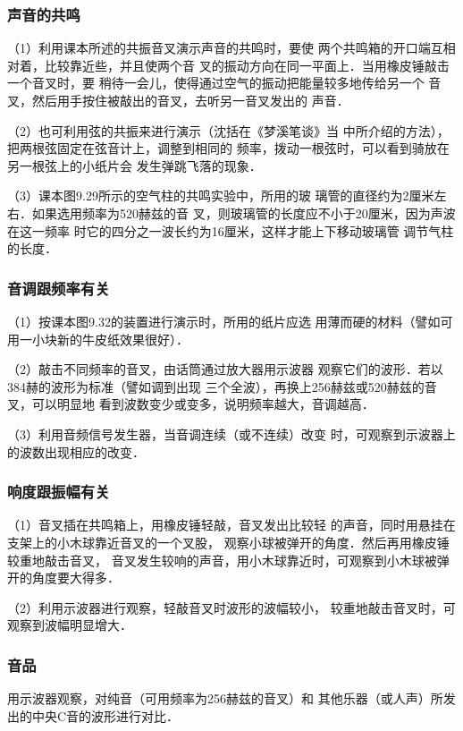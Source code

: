 \subsubsection{声音的共鸣}
（1）利用课本所述的共振音叉演示声音的共鸣时，要使
两个共鸣箱的开口端互相对着，比较靠近些，并且使两个音
叉的振动方向在同一平面上．当用橡皮锤敲击一个音叉时，要
稍待一会儿，使得通过空气的振动把能量较多地传给另一个
音叉，然后用手按住被敲出的音叉，去听另一音叉发出的
声音．

（2）也可利用弦的共振来进行演示（沈括在《梦溪笔谈》当
中所介绍的方法），把两根弦固定在弦音计上，调整到相同的
频率，拨动一根弦时，可以看到骑放在另一根弦上的小纸片会
发生弹跳飞落的现象．

（3）课本图9.29所示的空气柱的共鸣实验中，所用的玻
璃管的直径约为2厘米左右．如果选用频率为520赫兹的音
叉，则玻璃管的长度应不小于20厘米，因为声波在这一频率
时它的四分之一波长约为16厘米，这样才能上下移动玻璃管
调节气柱的长度．

\subsubsection{音调跟频率有关}
（1）按课本图9.32的装置进行演示时，所用的纸片应选
用薄而硬的材料（譬如可用一小块新的牛皮纸效果很好）．

（2）敲击不同频率的音叉，由话筒通过放大器用示波器
观察它们的波形．若以384赫的波形为标准（譬如调到出现
三个全波），再换上256赫兹或520赫兹的音叉，可以明显地
看到波数变少或变多，说明频率越大，音调越高．

（3）利用音频信号发生器，当音调连续（或不连续）改变
时，可观察到示波器上的波数出现相应的改变．

\subsubsection{响度跟振幅有关}
（1）音叉插在共鸣箱上，用橡皮锤轻敲，音叉发出比较轻
的声音，同时用悬挂在支架上的小木球靠近音叉的一个叉股，
观察小球被弹开的角度．然后再用橡皮锤较重地敲击音叉，
音叉发生较响的声音，用小木球靠近时，可观察到小木球被弹
开的角度要大得多．

（2）利用示波器进行观察，轻敲音叉时波形的波幅较小，
较重地敲击音叉时，可观察到波幅明显增大．

\subsubsection{音品}
用示波器观察，对纯音（可用频率为256赫兹的音叉）和
其他乐器（或人声）所发出的中央C音的波形进行对比．

